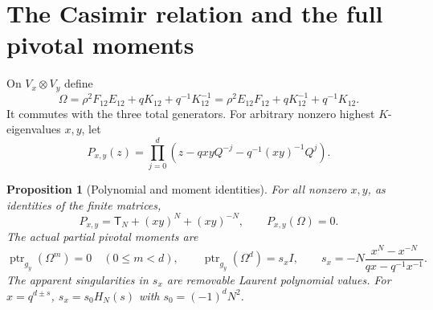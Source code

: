 \documentclass[11pt]{article}
\numberwithin{equation}{section}
\newtheorem{proposition}[theorem]{Proposition}
\theoremstyle{definition}\newtheorem{definition}[theorem]{Definition}
\theoremstyle{remark}\newtheorem{remark}[theorem]{Remark}
\newcommand{\ptr}{\operatorname{ptr}}
\newcommand{\Cheb}{\mathsf T}
\begin{document}
\section{The Casimir relation and the full pivotal moments}
On $V_x\otimes V_y$ define
\begin{equation}\label{mt:casimir}
 \Omega=\rho^2F_{12}E_{12}+qK_{12}+q^{-1}K_{12}^{-1}
       =\rho^2E_{12}F_{12}+qK_{12}^{-1}+q^{-1}K_{12}.
\end{equation}
It commutes with the three total generators. For arbitrary nonzero
highest $K$-eigenvalues $x,y$, let
\[
 P_{x,y}(z)=\prod_{j=0}^{d}
       (z-qxyQ^{-j}-q^{-1}(xy)^{-1}Q^j).
\]
\begin{proposition}[Polynomial and moment identities]\label{mt:moments}
For all nonzero $x,y$, as identities of the finite matrices,
\begin{equation}\label{mt:general-relation}
 P_{x,y}=\Cheb_N+(xy)^N+(xy)^{-N},\qquad P_{x,y}(\Omega)=0.
\end{equation}
The actual partial pivotal moments are
\begin{equation}\label{mt:moment-formula}
 \ptr_{g_y}(\Omega^m)=0\quad(0\le m<d),\qquad
 \ptr_{g_y}(\Omega^d)=s_xI,\qquad
 s_x=-N\frac{x^N-x^{-N}}{qx-q^{-1}x^{-1}}.
\end{equation}
The apparent singularities in $s_x$ are removable Laurent polynomial
values. For $x=q^{d\pm s}$,
$s_x=s_0H_N(s)$ with $s_0=(-1)^dN^2$.
\end{proposition}
\end{document}
